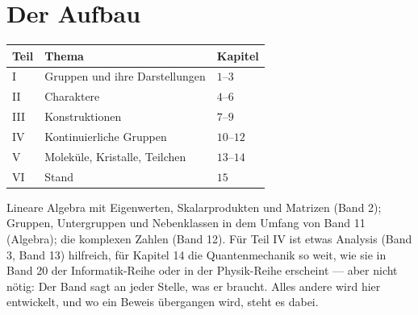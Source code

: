 \section*{Der Aufbau}

\begin{merksatz}
\begin{center}
{\small
\renewcommand{\arraystretch}{1.5}
\begin{tabular}{@{}P{1.4cm}P{4.2cm}P{2.4cm}@{}}
\toprule
\textbf{Teil} & \textbf{Thema} & \textbf{Kapitel}\\
\midrule
I & Gruppen und ihre Darstellungen & $1$--$3$\\
II & Charaktere & $4$--$6$\\
III & Konstruktionen & $7$--$9$\\
IV & Kontinuierliche Gruppen & $10$--$12$\\
V & Moleküle, Kristalle, Teilchen & $13$--$14$\\
VI & Stand & $15$\\
\bottomrule
\end{tabular}}
\end{center}

Lineare Algebra mit Eigenwerten, Skalarprodukten und Matrizen (Band 2); Gruppen, Untergruppen und Nebenklassen in dem Umfang von Band 11 (Algebra); die komplexen Zahlen (Band 12). Für Teil IV ist etwas Analysis (Band 3, Band 13) hilfreich, für Kapitel 14 die Quantenmechanik so weit, wie sie in Band 20 der Informatik-Reihe oder in der Physik-Reihe erscheint --- aber nicht nötig: Der Band sagt an jeder Stelle, was er braucht. Alles andere wird hier entwickelt, und wo ein Beweis übergangen wird, steht es dabei.

\begin{center}
\begin{minipage}{0.88\textwidth}
\end{minipage}
\end{center}
\end{merksatz}
